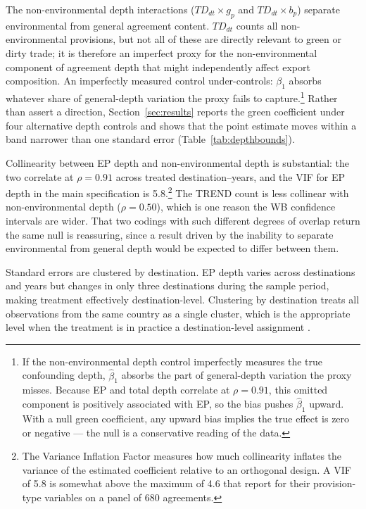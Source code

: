 \documentclass[12pt]{article}
\begin{document}
The non-environmental depth interactions ($TD_{dt} \times g_p$ and
$TD_{dt} \times b_p$) separate environmental from general agreement content.
$TD_{dt}$ counts all non-environmental provisions, but not all of these are
directly relevant to green or dirty trade; it is therefore an imperfect proxy for
the non-environmental component of agreement depth that might independently affect
export composition. An imperfectly measured control under-controls: $\beta_1$
absorbs whatever share of general-depth variation the proxy fails to
capture.\footnote{If the non-environmental depth control imperfectly measures the true confounding depth, $\hat{\beta}_1$ absorbs the part of general-depth variation the proxy misses. Because EP and total depth correlate at $\rho = 0.91$, this omitted component is positively associated with EP, so the bias pushes $\hat{\beta}_1$ upward. With a null green coefficient, any upward bias implies the true effect is zero or negative --- the null is a conservative reading of the data.} Rather than assert a direction, Section~\ref{sec:results} reports the
green coefficient under four alternative depth controls and shows that the point
estimate moves within a band narrower than one standard error
(Table~\ref{tab:depthbounds}).

Collinearity between EP depth and non-environmental depth is substantial: the two correlate at $\rho = 0.91$ across treated destination--years, and the VIF for EP depth in the main specification is 5.8.\footnote{The Variance Inflation Factor measures how much collinearity inflates the variance of the estimated coefficient relative to an orthogonal design. A VIF of 5.8 is somewhat above the maximum of 4.6 that \citet{brandi2020} report for their provision-type variables on a panel of 680 agreements.}
The TREND count is less
collinear with non-environmental depth ($\rho = 0.50$), which is one reason the WB
confidence intervals are wider. That two codings with such different degrees of
overlap return the same null is reassuring, since a result driven by the inability
to separate environmental from general depth would be expected to differ between
them.

Standard errors are clustered by destination. EP depth varies across destinations and years but changes in only three destinations during the sample period, making treatment effectively destination-level. Clustering by destination treats all observations from the same country as a single cluster, which is the appropriate level when the treatment is in practice a destination-level assignment \citep{abadie2023}.
\end{document}
